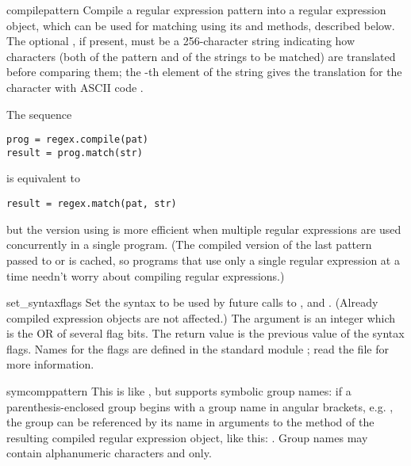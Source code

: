 \begin{funcdesc}{compile}{pattern}
  Compile a regular expression pattern into a regular expression
  object, which can be used for matching using its  and
   methods, described below.  The optional
  , if present, must be a 256-character string
  indicating how characters (both of the pattern and of the strings to
  be matched) are translated before comparing them; the -th
  element of the string gives the translation for the character with
  ASCII code .

  The sequence

\bcode\begin{verbatim}
prog = regex.compile(pat)
result = prog.match(str)
\end{verbatim}\ecode

is equivalent to

\bcode\begin{verbatim}
result = regex.match(pat, str)
\end{verbatim}\ecode

but the version using  is more efficient when multiple
regular expressions are used concurrently in a single program.  (The
compiled version of the last pattern passed to  or
 is cached, so programs that use only a single
regular expression at a time needn't worry about compiling regular
expressions.)
\end{funcdesc}

\begin{funcdesc}{set_syntax}{flags}
  Set the syntax to be used by future calls to ,
   and .  (Already compiled expression objects
  are not affected.)  The argument is an integer which is the OR of
  several flag bits.  The return value is the previous value of
  the syntax flags.  Names for the flags are defined in the standard
  module ; read the file  for
  more information.
\end{funcdesc}

\begin{funcdesc}{symcomp}{pattern}
This is like , but supports symbolic group names: if a
parenthesis-enclosed group begins with a group name in angular
brackets, e.g. , the group can
be referenced by its name in arguments to the  method of
the resulting compiled regular expression object, like this:
.  Group names may contain alphanumeric characters
and  only.
\end{funcdesc}


